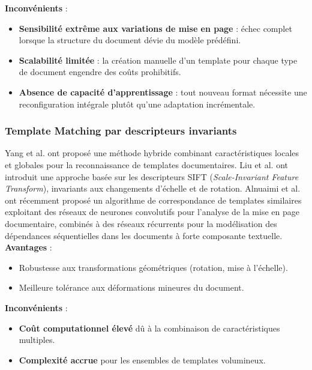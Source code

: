 \textbf{Inconvénients} :
\begin{itemize}[label=, font=\large \color{darkgray}]
\item \textbf{Sensibilité extrême aux variations de mise en page} : échec complet lorsque la structure du document dévie du modèle prédéfini.
\item \textbf{Scalabilité limitée} : la création manuelle d'un template pour chaque type de document engendre des coûts prohibitifs.
\item \textbf{Absence de capacité d'apprentissage} : tout nouveau format nécessite une reconfiguration intégrale plutôt qu'une adaptation incrémentale.
\end{itemize}


\subsubsection{Template Matching par descripteurs invariants}

Yang et al. \cite{yang2019hybrid} ont proposé une méthode hybride combinant caractéristiques locales et globales pour la reconnaissance de templates documentaires. Liu et al. \cite{liu2019sift} ont introduit une approche basée sur les descripteurs SIFT (\textit{Scale-Invariant Feature Transform}), invariants aux changements d'échelle et de rotation. Alnuaimi et al. \cite{alnuaimi2024similar} ont récemment proposé un algorithme de correspondance de templates similaires exploitant des réseaux de neurones convolutifs pour l'analyse de la mise en page documentaire, combinés à des réseaux récurrents pour la modélisation des dépendances séquentielles dans les documents à forte composante textuelle.
\\
\textbf{Avantages} :
\begin{itemize}[label=, font=\large \color{darkgray}]
\item Robustesse aux transformations géométriques (rotation, mise à l'échelle).
\item Meilleure tolérance aux déformations mineures du document.
\end{itemize}

\textbf{Inconvénients} :
\begin{itemize}[label=, font=\large \color{darkgray}]
\item \textbf{Coût computationnel élevé} dû à la combinaison de caractéristiques multiples.
\item \textbf{Complexité accrue} pour les ensembles de templates volumineux.
\end{itemize}


